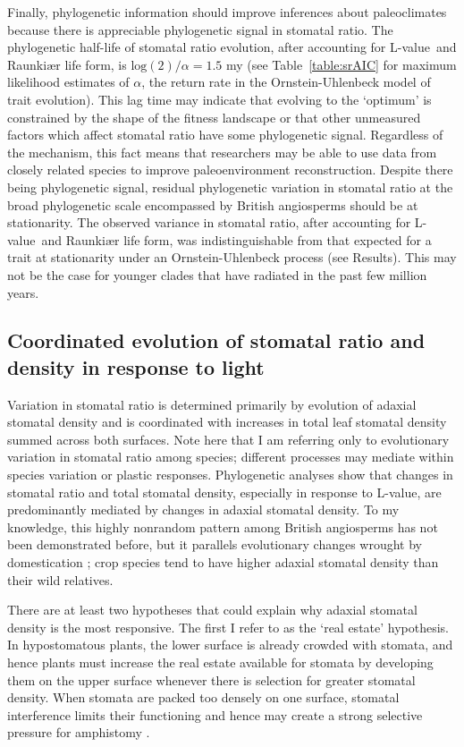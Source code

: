 \documentclass[12pt, oneside]{article}
\newcommand{\el}{L-value}
\begin{document}
Finally, phylogenetic information should improve inferences about paleoclimates because there is appreciable phylogenetic signal in stomatal ratio. The phylogenetic half-life of stomatal ratio evolution, after accounting for \el~and Raunki\ae r life form, is $\mathrm{log}(2) / \alpha = 1.5$ my (see Table~\ref{table:srAIC} for maximum likelihood estimates of $\alpha$, the return rate in the Ornstein-Uhlenbeck model of trait evolution). This lag time may indicate that evolving to the `optimum' is constrained by the shape of the fitness landscape \citep{Muir_2015} or that other unmeasured factors which affect stomatal ratio have some phylogenetic signal. Regardless of the mechanism, this fact means that researchers may be able to use data from closely related species to improve paleoenvironment reconstruction. Despite there being phylogenetic signal, residual phylogenetic variation in stomatal ratio at the broad phylogenetic scale encompassed by British angiosperms should be at stationarity. The observed variance in stomatal ratio, after accounting for \el~and Raunki\ae r life form, was indistinguishable from that expected for a trait at stationarity under an Ornstein-Uhlenbeck process (see Results). This may not be the case for younger clades that have radiated in the past few million years.

\subsection*{Coordinated evolution of stomatal ratio and density in response to light}

Variation in stomatal ratio is determined primarily by evolution of adaxial stomatal density and is coordinated with increases in total leaf stomatal density summed across both surfaces. Note here that I am referring only to evolutionary variation in stomatal ratio among species; different processes may mediate within species variation or plastic responses. Phylogenetic analyses show that changes in stomatal ratio and total stomatal density, especially in response to \el, are predominantly mediated by changes in adaxial stomatal density. To my knowledge, this highly nonrandom pattern among British angiosperms has not been demonstrated before, but it parallels evolutionary changes wrought by domestication \citep{Milla_etal_2013}; crop species tend to have higher adaxial stomatal density than their wild relatives. 

There are at least two hypotheses that could explain why adaxial stomatal density is the most responsive. The first I refer to as the `real estate' hypothesis. In hypostomatous plants, the lower surface is already crowded with stomata, and hence plants must increase the real estate available for stomata by developing them on the upper surface whenever there is selection for greater stomatal density. When stomata are packed too densely on one surface, stomatal interference limits their functioning and hence may create a strong selective pressure for amphistomy \citep{Parlange_Waggoner_1970, Dow_etal_2014a}. 
\end{document}
